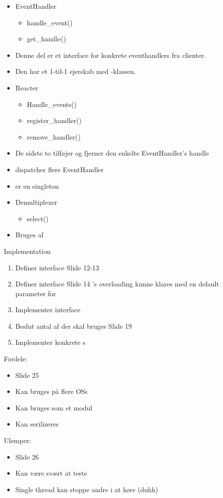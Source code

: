 \documentclass[10pt, a4]{Memoir}
\begin{document}
\begin{itemize}
\item EventHandler
	\begin{itemize}
	\item handle\_event()
	\item get\_handle()
	\end{itemize}
\item[] Denne del er et interface for konkrete eventhandlers fra clienter.
\item[] Den har et 1-til-1 ejerskab med -klassen.

\item Reacter
	\begin{itemize}
	\item Handle\_events()
	\item register\_handler()
	\item remove\_handler()
	\end{itemize}
\item[] De sidste to tilføjer og fjerner den enkelte EventHandler's handle
\item[]  dispatcher flere EventHandler
\item[]  er en singleton

\item Demultiplexer
	\begin{itemize}
	\item select()
	\end{itemize}
\item[] Bruges af 
\end{itemize}
Implementation
\begin{enumerate}
\item Definer  interface
\subitem Slide 12-13
\item Definer  interface
\subitem Slide 14
\subitem {}'s overloading kunne klares med en default parameter for 
\item Implementer  interface
\item Beslut antal af  der skal bruges
\subitem Slide 19
\item Implementer konkrete s
\end{enumerate}
Fordele:

\begin{itemize}
\item Slide 25
\item Kan bruges på flere OSs
\item Kan bruges som et modul
\item Kan serilizeres
\end{itemize}
Ulemper:
\begin{itemize}
\item Slide 26
\item Kan være svært at teste
\item Single thread kan stoppe andre i at køre (duhh)
\end{itemize}
\end{document}
